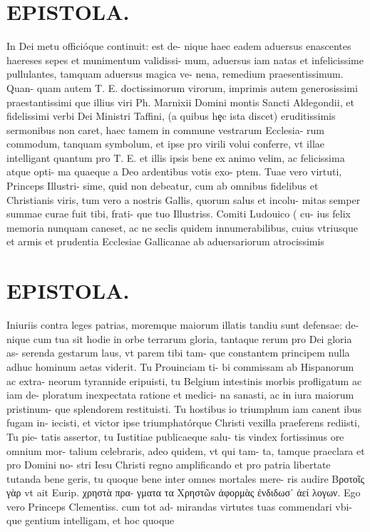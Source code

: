 \documentclass{article}
\begin{document}
\begin{pages}
\section*{EPISTOLA. }In Dei metu officióque continuit: est de- nique haec eadem aduersus enascentes haereses sepes et munimentum validissi- mum, aduersus iam natas et infelicissime pullulantes, tamquam aduersus magica ve- nena, remedium praesentissimum. Quan- quam autem T. E. doctissimorum virorum, imprimis autem generosissimi praestantissimi que illius viri Ph. Marnixii Domini montis Sancti Aldegondii, et fidelissimi verbi Dei Ministri Taffini, (a quibus hȩc ista discet) eruditissimis sermonibus non caret, haec tamem in commune vestrarum Ecclesia- rum commodum, tanquam symbolum, et ipse pro virili volui conferre, vt illae intelligant quantum pro T. E. et illis ipsis bene ex animo velim, ac felicissima atque opti- ma quaeque a Deo ardentibus votis exo- ptem. Tuae vero virtuti, Princeps Illustri- sime, quid non debeatur, cum ab omnibus fidelibus et Christianis viris, tum vero a nostris Gallis, quorum salus et incolu- mitas semper summae curae fuit tibi, frati- que tuo Illustriss. Comiti Ludouico ( cu- ius felix memoria nunquam caneset, ac ne seclis quidem innumerabilibus, cuius vtriusque et armis et prudentia Ecclesiae Gallicanae ab aduersariorum atrocissimis 
\section*{EPISTOLA. }Iniuriis contra leges patrias, moremque maiorum illatis tandiu sunt defensae: de- nique cum tua sit hodie in orbe terrarum gloria, tantaque rerum pro Dei gloria as- serenda gestarum laus, vt parem tibi tam- que constantem principem nulla adhuc hominum aetas viderit. Tu Prouinciam ti- bi commissam ab Hispanorum ac extra- neorum tyrannide eripuisti, tu Belgium intestinis morbis profligatum ac iam de- ploratum inexpectata ratione et medici- na sanasti, ac in iura maiorum pristinum- que splendorem restituisti. Tu hostibus io triumphum iam canent ibus fugam in- iecisti, et victor ipse triumphatórque Christi vexilla praeferens rediisti, Tu pie- tatis assertor, tu Iustitiae publicaeque salu- tis vindex fortissimus ore omnium mor- talium celebraris, adeo quidem, vt qui tam- ta, tamque praeclara et pro Domini no- stri Iesu Christi regno amplificando et pro patria libertate tutanda bene geris, tu quoque bene inter omnes mortales mere- ris audire Βροτοῖς γὰρ vt ait Eurip. χρηστὰ πρα- γματα τα Χρηστῶν ἀφορμὰς ἐνδιδωσ᾽ ἀεί λογων. Ego vero Princeps Clementiss. cum tot ad- mirandas virtutes tuas commendari vbi- que gentium intelligam, et hoc quoque 

\end{pages}
\end{document}
